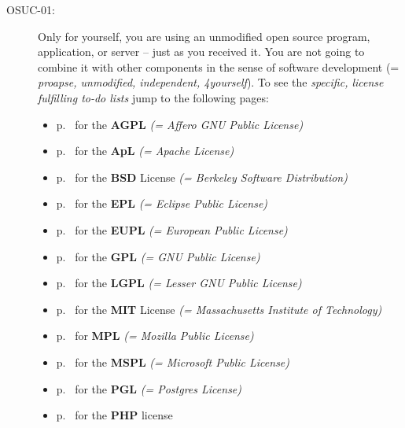 \begin{description}
\label{OSUCList}
\item[OSUC-01:]\label{OSUC-01-DEF}
Only for yourself, you are using an unmodified open source program, application,
or server -- just as you received it. You are not going to combine it with other
components in the sense of software development (= \textit{proapse, unmodified,
independent, 4yourself}). 
To see the \textit{specific, license fulfilling to-do lists} jump to the
following pages:
  \begin{itemize}
    \item p.\ \pageref{OSUC-01-AGPL} for the \textbf{AGPL}
      \textit{(= Affero GNU Public License)} 
    \item p.\ \pageref{OSUC-01-Apache20} for the \textbf{ApL}
      \textit{(= Apache License)}
    \item p.\ \pageref{OSUC-01-BSD} for the \textbf{BSD} License
      \textit{(= Berkeley Software Distribution)}
    \item p.\ \pageref{OSUC-01-EPL} for the \textbf{EPL}
      \textit{(= Eclipse Public License)}     
    \item p.\ \pageref{OSUC-01-EUPL} for the \textbf{EUPL}
      \textit{(= European Public License)} 
    \item p.\ \pageref{OSUC-01-GPL} for the \textbf{GPL}
       \textit{(= GNU Public License)} 
    \item p.\ \pageref{OSUC-01-LGPL} for the \textbf{LGPL}
      \textit{(= Lesser GNU Public License)}           
    \item p.\ \pageref{OSUC-01-MIT} for the \textbf{MIT} License
       \textit{(= Massachusetts Institute of Technology)} 
    \item p.\ \pageref{OSUC-01-MPL} for \textbf{MPL}
      \textit{(= Mozilla Public License)}     
    \item p.\ \pageref{OSUC-01-MsPL} for the \textbf{MSPL}
      \textit{(= Microsoft Public License)} 
    \item p.\ \pageref{OSUC-01-PGL} for the \textbf{PGL}
      \textit{(= Postgres License)} 
    \item p.\ \pageref{OSUC-01-PHP} for the \textbf{PHP} license 
  \end{itemize}


\end{description}
